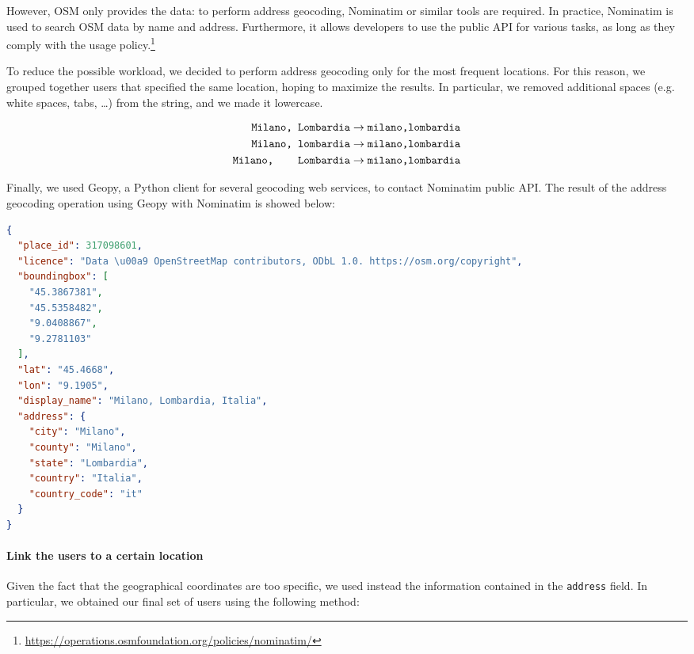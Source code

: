 However, OSM only provides the data: to perform address geocoding, Nominatim or similar tools are required. In practice, Nominatim is used to search OSM data by name and address. Furthermore, it allows developers to use the public API for various tasks, as long as they comply with the usage policy.\footnote{\url{https://operations.osmfoundation.org/policies/nominatim/}}

To reduce the possible workload, we decided to perform address geocoding only for the most frequent locations. For this reason, we grouped together users that specified the same location, hoping to maximize the results. In particular, we removed additional spaces (e.g. white spaces, tabs, \ldots) from the string, and we made it lowercase.

\begin{align*}
	\texttt{Milano, Lombardia} &\rightarrow \texttt{milano,lombardia} \\
	\texttt{Milano, lombardia} &\rightarrow \texttt{milano,lombardia} \\
	\texttt{Milano, \;\;\;\; Lombardia} &\rightarrow \texttt{milano,lombardia}
\end{align*}

Finally, we used Geopy, a Python client for several geocoding web services, to contact Nominatim public API. The result of the address geocoding operation using Geopy with Nominatim is showed below: 

\begin{lstlisting}[language=json, caption={Json object returned by Geopy given “Milano, Lombardia” as input}, captionpos=b, label={lst:nominatim-geocode}]
{
  "place_id": 317098601, 
  "licence": "Data \u00a9 OpenStreetMap contributors, ODbL 1.0. https://osm.org/copyright",
  "boundingbox": [
    "45.3867381", 
    "45.5358482", 
    "9.0408867", 
    "9.2781103"
  ], 
  "lat": "45.4668", 
  "lon": "9.1905", 
  "display_name": "Milano, Lombardia, Italia",
  "address": {
    "city": "Milano", 
    "county": "Milano",
    "state": "Lombardia", 
    "country": "Italia", 
    "country_code": "it"
  }
}
\end{lstlisting}

\paragraph{Link the users to a certain location}

Given the fact that the geographical coordinates are too specific, we used instead the information contained in the \texttt{address} field. In particular, we obtained our final set of users using the following method:

